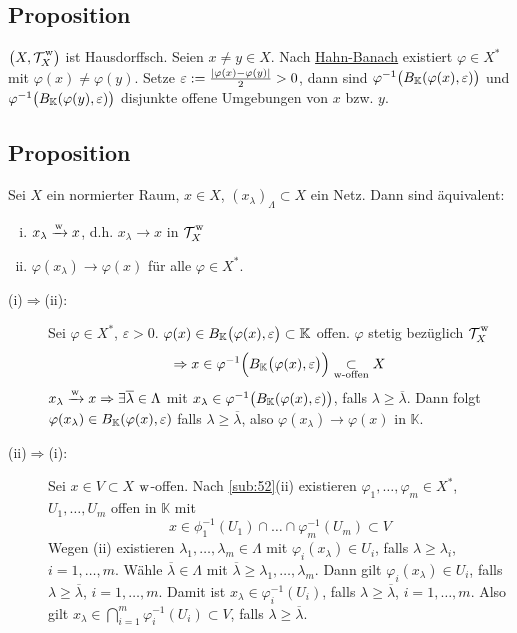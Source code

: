 \subsection[Proposition: Die schwache Topologie ist Hausdorffsch]{Proposition} %
\label{sub:53}
$\enbrace[\big]{X,\weakT{X}}$ ist Hausdorffsch.
Seien $x \not= y \in X$. Nach \hyperref[sub:227]{Hahn-Banach} existiert $\varphi \in X^*$ mit $\varphi(x) \not= \varphi(y)$. Setze 
$\varepsilon := \frac{\abs*{\varphi(x)- \varphi(y)} }{2}>0$, dann sind $\varphi ^{-1} \enbrace[\big]{B_\mathds{K} \enbrace*{\varphi(x),\varepsilon} } $ und
$\varphi ^{-1} \enbrace[\big]{B_\mathds{K} \enbrace*{\varphi(y), \varepsilon}}$ disjunkte offene Umgebungen von $x$ bzw. $y$. \bewende

\subsection[Proposition: Äquivalenz zu schwacher Konvergenz]{Proposition} %
\label{sub:54}
Sei $X$ ein normierter Raum, $x \in X$, $(x_\lambda )_\Lambda \subset X$ ein Netz. Dann sind äquivalent:
\begin{enumerate}[(i)]
	\item $x_\lambda \xrightarrow{\w}  x$, d.h. $x_\lambda \to x$ in $\weakT{X}$
	\item $\varphi(x_\lambda ) \to \varphi(x)$ für alle $\varphi \in X^*$.
\end{enumerate}
\begin{description}
	\item[(i)$\Rightarrow$(ii):] Sei $\varphi \in X^*$, $\varepsilon>0$. $\varphi(x) \in B_\mathds{K}\enbrace[\big]{\varphi(x),\varepsilon} \subset \mathds{K}$ offen.
	$\varphi$ stetig bezüglich $\weakT{X}$
	\[
		\Rightarrow  x \in \varphi ^{-1} \enbrace[\Big]{ B_\mathds{K}\enbrace[\big]{\varphi(x), \varepsilon} } \underset{\text{$\w$-offen}}{\subset} X 
	\] 
	$x_\lambda \xrightarrow{\w} x  \Rightarrow  \exists \overline{\lambda } \in \Lambda$ mit 
	$x_\lambda \in \varphi^{-1}\enbrace[\big]{B_\mathds{K}\enbrace*{\varphi(x), \varepsilon}}$, falls $\lambda \ge \overline{\lambda }$. Dann folgt
	$\varphi(x_\lambda ) \in B_\mathds{K}\enbrace*{\varphi(x),\varepsilon}$ falls $\lambda \ge \overline{\lambda}$, also $\varphi(x_\lambda ) \to \varphi(x)$ in $\mathds{K}$.
	\item[(ii)$\Rightarrow$(i):] Sei $x \in V \subset X$ $\w$-offen. Nach \ref{sub:52}(ii) existieren $\varphi_1, \ldots , \varphi_m \in X^*$, $U_1, \ldots , U_m$ offen in
	$\mathds{K}$ mit 
	\[
		x \in \phi_1 ^{-1}(U_1) \cap \ldots  \cap \varphi_m ^{-1}(U_m) \subset V
	\]
	Wegen (ii) existieren $\lambda_1, \ldots , \lambda _m \in \Lambda$ mit $\varphi_i(x_\lambda ) \in U_i$, falls $\lambda  \ge \lambda_i$, $i=1,\ldots,m$.
	Wähle $\overline{\lambda} \in \Lambda$ mit $\overline{\lambda} \ge \lambda_1, \ldots , \lambda_m$. Dann gilt $\varphi_i(x_\lambda) \in U_i$, falls 
	$\lambda \ge \overline{\lambda}$, $i=1,\ldots ,m$. Damit ist $x_\lambda \in \varphi_i ^{-1}(U_i)$, falls $\lambda \ge \overline{\lambda}$, $i=1,\ldots,m$. Also gilt
	$x_\lambda \in \bigcap_{i=1}^m \varphi_i ^{-1}(U_i) \subset V$, falls $\lambda \ge \overline{\lambda}$. \bewende
\end{description}

